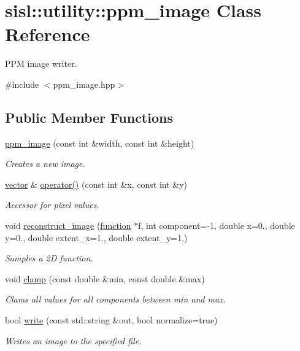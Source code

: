 \hypertarget{classsisl_1_1utility_1_1ppm__image}{}\section{sisl\+:\+:utility\+:\+:ppm\+\_\+image Class Reference}
\label{classsisl_1_1utility_1_1ppm__image}


P\+PM image writer.  




{\ttfamily \#include $<$ppm\+\_\+image.\+hpp$>$}

\subsection*{Public Member Functions}
\begin{DoxyCompactItemize}
\item 
\hyperlink{classsisl_1_1utility_1_1ppm__image_ab049aa633ce351727260eb9ca82b6a71}{ppm\+\_\+image} (const int \&width, const int \&height)
\begin{DoxyCompactList}\small\item\em Creates a new image. \end{DoxyCompactList}\item 
\hyperlink{namespacesisl_a2069bd5374a9be042ff3ce3306d41e1a}{vector} \& \hyperlink{classsisl_1_1utility_1_1ppm__image_ad2ec02b1fcc76fbaa3d4df71200e0521}{operator()} (const int \&x, const int \&y)
\begin{DoxyCompactList}\small\item\em Accessor for pixel values. \end{DoxyCompactList}\item 
void \hyperlink{classsisl_1_1utility_1_1ppm__image_a7e3ae9169fecfcd95dc8352fa4ca1c12}{reconstruct\+\_\+image} (\hyperlink{classsisl_1_1function}{function} $\ast$f, int component=-\/1, double x=0., double y=0., double extent\+\_\+x=1., double extent\+\_\+y=1.)
\begin{DoxyCompactList}\small\item\em Samples a 2D function. \end{DoxyCompactList}\item 
void \hyperlink{classsisl_1_1utility_1_1ppm__image_a2fd1c61391d4be4802be8e2af85d507c}{clamp} (const double \&min, const double \&max)
\begin{DoxyCompactList}\small\item\em Clams all values for all components between min and max. \end{DoxyCompactList}\item 
bool \hyperlink{classsisl_1_1utility_1_1ppm__image_ac84d6c79a7ea161cb0588c838994d9d0}{write} (const std\+::string \&out, bool normalize=true)
\begin{DoxyCompactList}\small\item\em Writes an image to the specified file. \end{DoxyCompactList}\end{DoxyCompactItemize}


